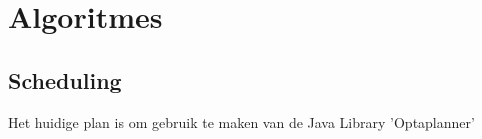 \section{Algoritmes}
\subsection{Scheduling}
Het huidige plan is om gebruik te maken van de Java Library 'Optaplanner'
